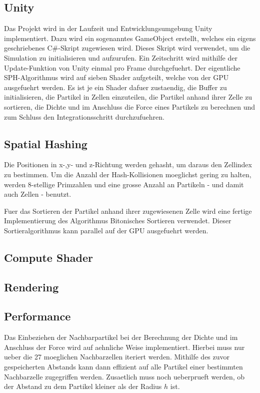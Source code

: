 \documentclass[a4paper]{paper}
\begin{document}
\subsection{Unity}
Das Projekt wird in der Laufzeit und Entwicklungsumgebung Unity implementiert. Dazu wird ein sogenanntes GameObject erstellt, welches ein eigens geschriebenes C\#-Skript zugewiesen wird. Dieses Skript wird verwendet, um die Simulation zu initialisieren und aufzurufen. %
Ein Zeitschritt wird mithilfe der Update-Funktion von Unity einmal pro Frame durchgefuehrt. Der eigentliche SPH-Algorithmus wird auf sieben Shader aufgeteilt, welche von der GPU ausgefuehrt werden.
 Es ist je ein Shader dafuer zustaendig, die Buffer zu initialisieren, die Partikel in Zellen einzuteilen, die Partikel anhand ihrer Zelle zu sortieren, die Dichte und im Anschluss die Force eines Partikels zu berechnen und zum Schluss den Integrationsschritt durchzufuehren.
\subsection{Spatial Hashing}%
Die Positionen in x-,y- und z-Richtung werden gehasht, um daraus den Zellindex zu bestimmen. Um die Anzahl der Hash-Kollisionen moeglichst gering zu halten, werden 8-stellige Primzahlen und eine grosse Anzahl an Partikeln - und damit auch Zellen - benutzt.

Fuer das Sortieren der Partikel anhand ihrer zugewiesenen Zelle wird eine fertige Implementierung des Algorithmus Bitonisches Sortieren verwendet. Dieser Sortieralgorithmus kann parallel auf der GPU ausgefuehrt werden.

\subsection{Compute Shader}

\subsection{Rendering}
\subsection{Performance}



Das Einbeziehen der Nachbarpartikel bei der Berechnung der Dichte und im Anschluss der Force wird auf aehnliche Weise implementiert. Hierbei muss nur ueber die 27 moeglichen Nachbarzellen iteriert werden. Mithilfe des zuvor gespeicherten Abstands kann dann effizient auf alle Partikel einer bestimmten Nachbarzelle zugegriffen werden. Zusaetlich muss noch ueberprueft werden, ob der Abstand zu dem Partikel kleiner als der Radius $h$ ist.
\end{document}
